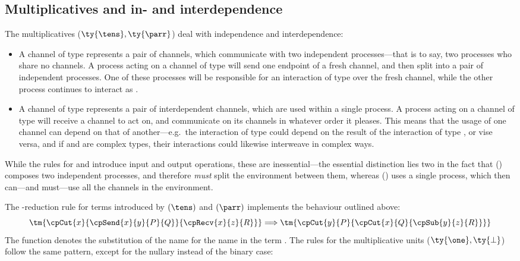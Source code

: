 \documentclass[UKenglish]{llncs}
\begin{document}
\subsection{Multiplicatives and in- and interdependence}
\label{sec:cp-multiplicatives}
The multiplicatives ($\ty{\tens}, \ty{\parr}$) deal with independence and
interdependence:
\begin{itemize}
\item
  A channel of type  represents a pair of channels, which
  communicate with two independent processes---that is to say, two
  processes who share no channels.
  A process acting on a channel of type  will send one endpoint of
  a fresh channel, and then split into a pair of independent processes.
  One of these processes will be responsible for an interaction of type 
  over the fresh channel, while the other process continues to interact as
  .
\item
  A channel of type  represents a pair of interdependent channels,
  which are used within a single process.
  A process acting on a channel of type  will receive a channel to
  act on, and communicate on its channels in whatever order it pleases.
  This means that the usage of one channel can depend on that of
  another---e.g.\ the interaction of type  could depend on the result of
  the interaction of type , or vise versa, and if  and  are
  complex types, their interactions could likewise interweave in complex ways.
\end{itemize}
While the rules for \ty{\tens} and \ty{\parr} introduce input and output
operations, these are inessential---the essential distinction lies two in the
fact that (\tens) composes two independent processes, and therefore \emph{must}
split the environment between them, whereas (\parr) uses a single process, which
then can---and must---use all the channels in the environment.
\begin{center}
  \cpInfTens
  \cpInfParr
\end{center}
The \textbeta-reduction rule for terms introduced by $(\tens)$ and $(\parr)$
implements the behaviour outlined above:
\[
  \tm{\cpCut{x}{\cpSend{x}{y}{P}{Q}}{\cpRecv{x}{z}{R}}}
  \Longrightarrow
  \tm{\cpCut{y}{P}{\cpCut{x}{Q}{\cpSub{y}{z}{R}}}}
\]
The function  denotes the substitution of the name 
for the name  in the term .
%
The rules for the multiplicative units ($\ty{\one}, \ty{\bot}$) follow the same
pattern, except for the nullary instead of the binary case:
\end{document}
